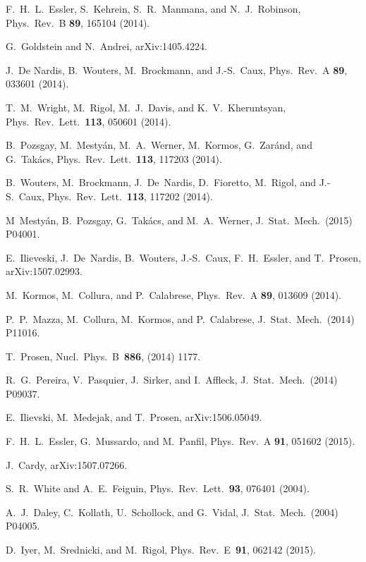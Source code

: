 \documentclass[twocolumn,superscriptaddress,prb,10pt]{revtex4-1}
\begin{document}
\begin{thebibliography}{99}
F.~H.~L.~Essler, S.~Kehrein, S.~R.~Manmana, and N.~J.~Robinson, Phys.\ Rev.\ B {\bf 89}, 
165104 (2014).

G.~Goldstein and N.~Andrei, arXiv:1405.4224. 


J.~De Nardis, B.~Wouters, M.~Brockmann, and J.-S.~Caux, Phys.\ Rev.\ A {\bf 89}, 
033601 (2014). 

T.~M.~Wright, M.~Rigol, M.~J.~Davis, and K.~V.~Kheruntsyan, Phys.\ Rev.\ Lett.\ {\bf 113}, 
050601 (2014).

B.~Pozsgay, M.~Mesty\'an, M.~A.~Werner, M.~Kormos, G.~Zar\'and, and G.~Tak\'acs,
Phys.\ Rev.\ Lett.\ {\bf 113}, 117203 (2014). 

B.~Wouters, M.~Brockmann, J.~De~Nardis, D.~Fioretto, M.~Rigol, and J.-S.~Caux, 
Phys.\ Rev.\ Lett.\ {\bf 113}, 117202 (2014). 

M~Mesty\'an, B.~Pozsgay, G.~Tak\'acs, and M.~A.~Werner, J.\ Stat.\ Mech.\ (2015) 
P04001.


E.~Ilieveski, J.~De~Nardis, B.~Wouters, J.-S.~Caux, F.~H.~Essler, and T.~Prosen, 
arXiv:1507.02993. 

M.~Kormos, M.~Collura, and P.~Calabrese, Phys.\ Rev.\ A {\bf 89}, 013609 
(2014).


P.~P.~Mazza, M.\ Collura, M.\ Kormos, and P.\ Calabrese, J.\ Stat.\ Mech.\  
(2014) P11016.

T.~Prosen, Nucl.\ Phys.\ B\ {\bf 886}, (2014) 1177.

R.~G.~Pereira, V.~Pasquier, J.~Sirker, and I.~Affleck, J.\ Stat.\ Mech.\ 
(2014) P09037. 

E.~Ilievski, M.~Medejak, and T.~Prosen, arXiv:1506.05049.

F.~H.~L.~Essler, G.~Mussardo, and M.~Panfil, Phys.\ Rev.\ A {\bf 91}, 051602 (2015). 

\bibitem{cardy-2015}
J.~Cardy,  arXiv:1507.07266.

S.~R.~White and A.~E.~Feiguin, Phys.\ Rev.\ Lett.\ {\bf 93}, 076401 (2004).

\bibitem{daley-2004}
A.~J.~Daley, C.~Kollath, U.~Schollock, and G.~Vidal, J.\ Stat.\ Mech.\ (2004) P04005.

\bibitem{iyer-2015}
D.~Iyer, M.~Srednicki, and M.~Rigol, Phys.\ Rev.\ E\ {\bf 91}, 062142 (2015).


\end{thebibliography}
\end{document}
